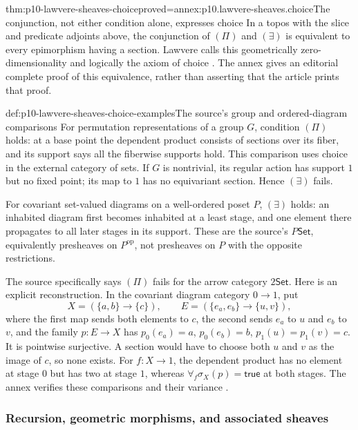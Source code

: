 \begin{hbtheorem}{thm:p10-lawvere-sheaves-choice}{proved=annex:p10.lawvere-sheaves.choice}{The conjunction, not either condition alone, expresses choice}
In a topos with the slice and predicate adjoints above, the conjunction
of \((\Pi)\) and \((\exists)\) is equivalent to every epimorphism
having a section.  Lawvere calls this geometrically
zero-dimensionality and logically the axiom of choice
\cite[p.~330]{Lawvere1970}.  The annex gives an editorial complete
proof of this equivalence, rather than asserting that the article
prints that proof.
\end{hbtheorem}

\begin{hbexample}{def:p10-lawvere-sheaves-choice-examples}{The source's group and ordered-diagram comparisons}
For permutation representations of a group \(G\), condition
\((\Pi)\) holds: at a base point the dependent product consists of
sections over its fiber, and its support says all the fiberwise
supports hold.  This comparison uses choice in the external category
of sets.  If \(G\) is nontrivial, its regular action has support
\(1\) but no fixed point; its map to \(1\) has no equivariant
section.  Hence \((\exists)\) fails.

For covariant set-valued diagrams on a well-ordered poset \(P\),
\((\exists)\) holds: an inhabited diagram first becomes inhabited
at a least stage, and one element there propagates to all later
stages in its support.  These are the source's \(P\mathsf{Set}\),
equivalently presheaves on \(P^{\mathrm{op}}\), not presheaves
on \(P\) with the opposite restrictions.

The source specifically says \((\Pi)\) fails for the arrow category
\(2\mathsf{Set}\).  Here is an explicit reconstruction.  In the
covariant diagram category \(0\to1\), put
\[
 X=(\{a,b\}\to\{c\}),\qquad
 E=(\{e_a,e_b\}\to\{u,v\}),
\]
where the first map sends both elements to \(c\), the second sends
\(e_a\) to \(u\) and \(e_b\) to \(v\), and the family
\(p:E\to X\) has \(p_0(e_a)=a\), \(p_0(e_b)=b\),
\(p_1(u)=p_1(v)=c\).  It is pointwise surjective.  A section
would have to choose both \(u\) and \(v\) as the image of \(c\),
so none exists.  For \(f:X\to1\), the dependent product has no
element at stage \(0\) but has two at stage \(1\), whereas
\(\forall_f\sigma_X(p)=\mathsf{true}\) at both stages.
The annex verifies these comparisons and their variance
\cite[p.~330]{Lawvere1970}.
\end{hbexample}

\subsubsection{Recursion, geometric morphisms, and associated sheaves}


